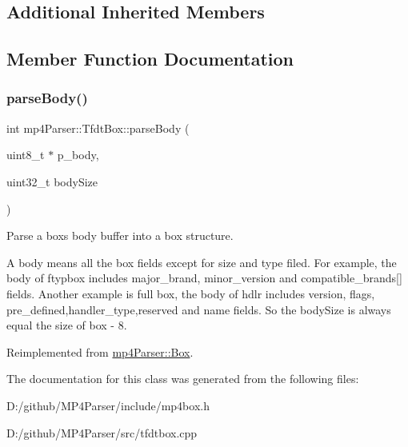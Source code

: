 \subsection*{Additional Inherited Members}


\subsection{Member Function Documentation}
\mbox{\label{classmp4_parser_1_1_tfdt_box_ae73900672f8fe353a6fee9a37b971ad4}} 
\subsubsection{\texorpdfstring{parseBody()}{parseBody()}}
{\footnotesize\ttfamily int mp4\+Parser\+::\+Tfdt\+Box\+::parse\+Body (\begin{DoxyParamCaption}\item[{uint8\+\_\+t $\ast$}]{p\+\_\+body,  }\item[{uint32\+\_\+t}]{body\+Size }\end{DoxyParamCaption})\hspace{0.3cm}{\ttfamily [virtual]}}



Parse a box\textquotesingle{}s body buffer into a box structure. 

A body means all the box fields except for size and type filed. For example, the body of ftypbox includes major\+\_\+brand, minor\+\_\+version and compatible\+\_\+brands\mbox{[}\mbox{]} fields. Another example is full box, the body of hdlr includes version, flags, pre\+\_\+defined,handler\+\_\+type,reserved and name fields. So the body\+Size is always equal the size of box -\/ 8. 

Reimplemented from \mbox{\hyperlink{classmp4_parser_1_1_box_a3dd0c084ac65bc77b69ac5ecaf796cb2}{mp4\+Parser\+::\+Box}}.



The documentation for this class was generated from the following files\+:\begin{DoxyCompactItemize}
\item 
D\+:/github/\+M\+P4\+Parser/include/mp4box.\+h\item 
D\+:/github/\+M\+P4\+Parser/src/tfdtbox.\+cpp\end{DoxyCompactItemize}
